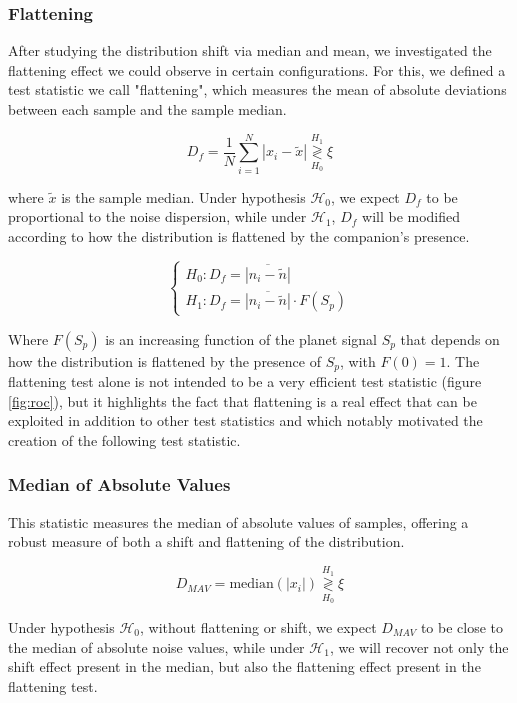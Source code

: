 \documentclass{article}
\begin{document}
\subsubsection{Flattening}

After studying the distribution shift via median and mean, we investigated the flattening effect we could observe in certain configurations. For this, we defined a test statistic we call "flattening", which measures the mean of absolute deviations between each sample and the sample median.

$$
D_f = \frac 1 N \sum_{i=1}^N |x_i - \tilde{x}| \stackrel{H_1}{\underset{H_0}{\gtrless}} \xi
$$

where $\tilde{x}$ is the sample median. Under hypothesis $\mathcal{H}_0$, we expect $D_f$ to be proportional to the noise dispersion, while under $\mathcal{H}_1$, $D_f$ will be modified according to how the distribution is flattened by the companion's presence.

$$
\begin{cases}
H_0 : D_f = \overline{|n_i - \tilde{n}|}\\
H_1 : D_f = \overline{|n_i - \tilde{n}|} \cdot F(S_p)
\end{cases}
$$

Where $F(S_p)$ is an increasing function of the planet signal $S_p$ that depends on how the distribution is flattened by the presence of $S_p$, with $F(0)=1$. The flattening test alone is not intended to be a very efficient test statistic (figure \ref{fig:roc}), but it highlights the fact that flattening is a real effect that can be exploited in addition to other test statistics and which notably motivated the creation of the following test statistic.

\subsubsection{Median of Absolute Values}

This statistic measures the median of absolute values of samples, offering a robust measure of both a shift and flattening of the distribution.

$$
D_{MAV} = \text{median}(|x_i|) \stackrel{H_1}{\underset{H_0}{\gtrless}} \xi
$$

Under hypothesis $\mathcal{H}_0$, without flattening or shift, we expect $D_{MAV}$ to be close to the median of absolute noise values, while under $\mathcal{H}_1$, we will recover not only the shift effect present in the median, but also the flattening effect present in the flattening test.
\end{document}
